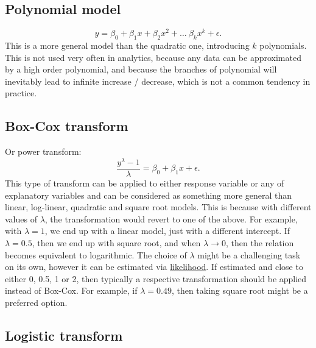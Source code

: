 \documentclass[
]{book}
\theoremstyle{definition}
\theoremstyle{definition}
\theoremstyle{definition}
\theoremstyle{definition}
\theoremstyle{remark}
\begin{document}
\hypertarget{polynomial-model}{%
\subsection{Polynomial model}\label{polynomial-model}}

\begin{equation}
    y = \beta_0 + \beta_1 x + \beta_2 x^2 + \dots \ \beta_k x^k + \epsilon .
    \label{eq:transformPolynomial}
\end{equation}
This is a more general model than the quadratic one, introducing \(k\) polynomials. This is not used very often in analytics, because any data can be approximated by a high order polynomial, and because the branches of polynomial will inevitably lead to infinite increase / decrease, which is not a common tendency in practice.

\hypertarget{box-cox-transform}{%
\subsection{Box-Cox transform}\label{box-cox-transform}}

Or power transform:
\begin{equation}
    \frac{y^\lambda -1}{\lambda} = \beta_0 + \beta_1 x + \epsilon .
    \label{eq:transformBoxCox}
\end{equation}
This type of transform can be applied to either response variable or any of explanatory variables and can be considered as something more general than linear, log-linear, quadratic and square root models. This is because with different values of \(\lambda\), the transformation would revert to one of the above. For example, with \(\lambda=1\), we end up with a linear model, just with a different intercept. If \(\lambda=0.5\), then we end up with square root, and when \(\lambda \rightarrow 0\), then the relation becomes equivalent to logarithmic. The choice of \(\lambda\) might be a challenging task on its own, however it can be estimated via \protect\hyperlink{likelihoodApproach}{likelihood}. If estimated and close to either 0, 0.5, 1 or 2, then typically a respective transformation should be applied instead of Box-Cox. For example, if \(\lambda=0.49\), then taking square root might be a preferred option.

\hypertarget{logistic-transform}{%
\subsection{Logistic transform}\label{logistic-transform}}
\end{document}
